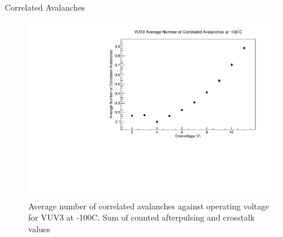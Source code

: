 \documentclass{beamer}
\begin{document}
\begin{frame}{Correlated Avalanches}
\begin{figure}
\centering
\includegraphics[height=0.5\textwidth]{VUV3_CA_vs_OV.pdf}
\caption{Average number of correlated avalanches against operating voltage for VUV3 at -100C. Sum of counted afterpulsing and crosstalk values}
\end{figure}
\end{frame}
\end{document}
